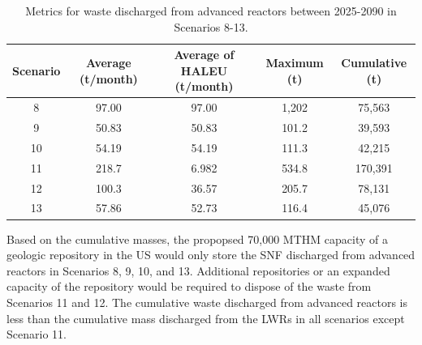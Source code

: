 \begin{table}
    \centering 
    \caption{Metrics for waste discharged from advanced reactors 
    between 2025-2090 in Scenarios 8-13.}
    \label{tab:1percent_waste}
    \begin{tabular}{c c c c c}
        \hline
        Scenario & Average (t/month) & Average of \gls{HALEU} (t/month) 
        & Maximum (t) & Cumulative (t)\\\hline
        8 & 97.00 & 97.00 & 1,202 & 75,563 \\
        9 & 50.83 & 50.83 & 101.2 & 39,593 \\
        10 & 54.19 & 54.19 & 111.3 & 42,215 \\
        11 & 218.7 & 6.982 & 534.8 & 170,391 \\
        12 & 100.3 & 36.57 & 205.7 & 78,131 \\
        13 & 57.86 & 52.73 & 116.4 & 45,076 \\
        \hline
    \end{tabular}
\end{table}

Based on the cumulative masses, the propopsed 70,000 MTHM capacity of 
a geologic repository in the US would only store the \gls{SNF} 
discharged from advanced reactors in Scenarios 8, 9, 10, and 13. Additional 
repositories or an expanded capacity of the repository would be required 
to dispose of the waste from Scenarios 11 and 12. The 
cumulative waste discharged from advanced reactors is less than the 
cumulative mass discharged from the \glspl{LWR} in all scenarios except 
Scenario 11. 

